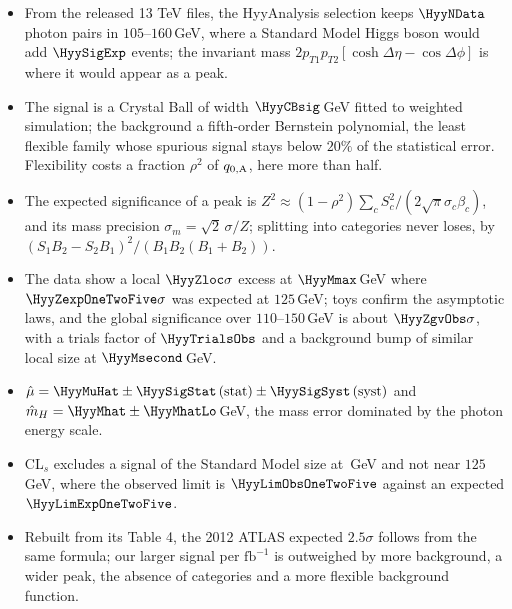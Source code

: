 \begin{recap}
\begin{itemize}[itemsep=1pt,leftmargin=1.2em]
  \item From the released 13 TeV files, the HyyAnalysis selection keeps $\HyyNData$ photon
        pairs in $105$--$160\,$GeV, where a Standard Model Higgs boson would add
        $\HyySigExp$ events; the invariant mass $2p_{T1}p_{T2}[\cosh\Delta\eta-\cos\Delta\phi]$
        is where it would appear as a peak.
  \item The signal is a Crystal Ball of width $\HyyCBsig\,$GeV fitted to weighted
        simulation; the background a fifth-order Bernstein polynomial, the least
        flexible family whose spurious signal stays below $20\%$ of the statistical error.
        Flexibility costs a fraction $\rho^2$ of $q_{0,\rm A}$, here more than half.
  \item The expected significance of a peak is
        $Z^2\approx(1-\rho^2)\sum_cS_c^2/(2\sqrt\pi\sigma_c\beta_c)$, and its mass precision
        $\sigma_m=\sqrt2\,\sigma/Z$; splitting into categories never loses, by
        $(S_1B_2-S_2B_1)^2/(B_1B_2(B_1+B_2))$.
  \item The data show a local $\HyyZloc\sigma$ excess at $\HyyMmax\,$GeV where
        $\HyyZexpOneTwoFive\sigma$ was expected at $125\,$GeV; toys confirm the asymptotic
        laws, and the global significance over $110$--$150\,$GeV is about
        $\HyyZgvObs\sigma$, with a trials factor of $\HyyTrialsObs$ and a background
        bump of similar local size at $\HyyMsecond\,$GeV.
  \item $\hat\mu=\HyyMuHat\pm\HyySigStat\,(\text{stat})\pm\HyySigSyst\,(\text{syst})$ and
        $\hat m_H=\HyyMhat\pm\HyyMhatLo\,$GeV, the mass error dominated by the photon
        energy scale.
  \item CL$_s$ excludes a signal of the Standard Model size at \HyyExclRanges\,GeV and
        not near $125\,$GeV, where the observed limit is $\HyyLimObsOneTwoFive$ against an
        expected $\HyyLimExpOneTwoFive$.
  \item Rebuilt from its Table 4, the 2012 ATLAS expected $2.5\sigma$ follows from the same
        formula; our larger signal per $\mathrm{fb}^{-1}$ is outweighed by more background,
        a wider peak, the absence of categories and a more flexible background function.
\end{itemize}
\end{recap}
\providecommand{\ThirteenEFskyPmaskFull}{}\renewcommand{\ThirteenEFskyPmaskFull}{0.929}
